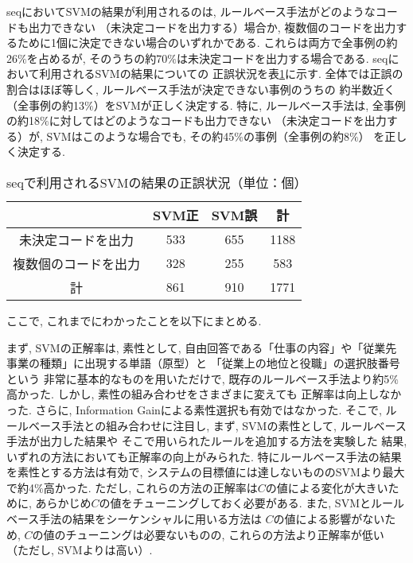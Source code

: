 \documentclass{nlp}
\begin{document}
seqにおいてSVMの結果が利用されるのは, 
ルールベース手法がどのようなコードも出力できない
（未決定コードを出力する）場合か, 
複数個のコードを出力するために1個に決定できない場合のいずれかである. 
これらは両方で全事例の約26$\%$を占めるが, 
そのうちの約70$\%$は未決定コードを出力する場合である. 
seqにおいて利用されるSVMの結果についての
正誤状況を表\ref{ROCCOSVM}に示す. 
全体では正誤の割合はほぼ等しく, 
ルールベース手法が決定できない事例のうちの
約半数近く（全事例の約13$\%$）をSVMが正しく決定する. 
特に, ルールベース手法は, 
全事例の約18$\%$に対してはどのようなコードも出力できない
（未決定コードを出力する）が, 
SVMはこのような場合でも, その約45$\%$の事例（全事例の約8$\%$）
を正しく決定する. 

\begin{table}
\begin{center}
\caption{seqで利用されるSVMの結果の正誤状況（単位：個）}
\begin{tabular}{c|ccc}
\hline\hline
&SVM正&SVM誤&計\\
\hline
未決定コードを出力&533&655&1188\\
複数個のコードを出力&328&255&583\\
\hline
計&861&910&1771\\
\hline
\end{tabular}
\label{ROCCOSVM}
\end{center}
\end{table}

ここで, 
これまでにわかったことを以下にまとめる. 

まず, 
SVMの正解率は, 素性として, 
自由回答である「仕事の内容」や「従業先事業の種類」に出現する単語（原型）と
「従業上の地位と役職」の選択肢番号という
非常に基本的なものを用いただけで, 
既存のルールベース手法より約5$\%$高かった. 
しかし, 
素性の組み合わせをさまざまに変えても
正解率は向上しなかった. 
さらに, 
Information Gainによる素性選択も有効ではなかった. 
そこで, 
ルールベース手法との組み合わせに注目し, 
まず, 
SVMの素性として, 
ルールベース手法が出力した結果や
そこで用いられたルールを追加する方法を実験した
結果, 
いずれの方法においても正解率の向上がみられた. 
特にルールベース手法の結果を素性とする方法は有効で, 
システムの目標値には達しないもののSVMより最大で約4$\%$高かった. 
ただし, 
これらの方法の正解率は$C$の値による変化が大きいために, 
あらかじめ$C$の値をチューニングしておく必要がある. 
また, SVMとルールベース手法の結果をシーケンシャルに用いる方法は
$C$の値による影響がないため, 
$C$の値のチューニングは必要ないものの,
これらの方法より正解率が低い
（ただし, SVMよりは高い）. 
\end{document}
